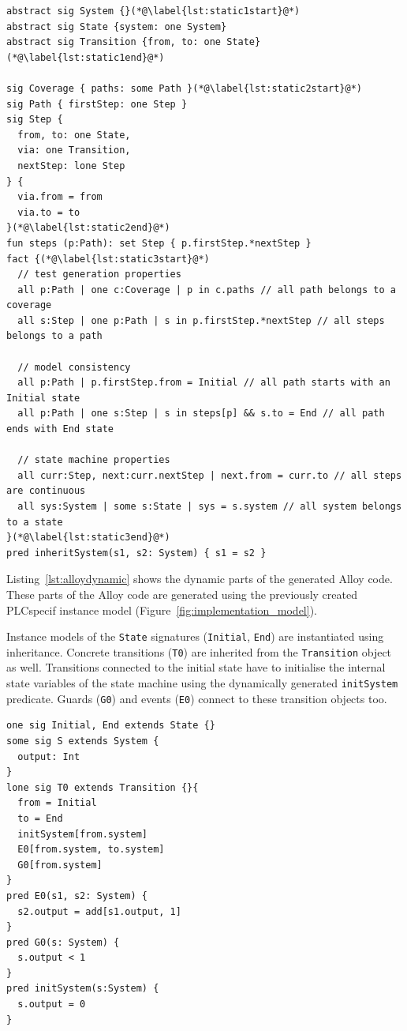 \begin{lstlisting}[label={lst:alloystatic}, caption=Static parts of the generated Alloy code,breaklines=true]
abstract sig System {}(*@\label{lst:static1start}@*)
abstract sig State {system: one System}
abstract sig Transition {from, to: one State}(*@\label{lst:static1end}@*)

sig Coverage { paths: some Path }(*@\label{lst:static2start}@*)
sig Path { firstStep: one Step }
sig Step {
  from, to: one State,
  via: one Transition,
  nextStep: lone Step
} {
  via.from = from
  via.to = to
}(*@\label{lst:static2end}@*)
fun steps (p:Path): set Step { p.firstStep.*nextStep }
fact {(*@\label{lst:static3start}@*)
  // test generation properties
  all p:Path | one c:Coverage | p in c.paths // all path belongs to a coverage
  all s:Step | one p:Path | s in p.firstStep.*nextStep // all steps belongs to a path

  // model consistency
  all p:Path | p.firstStep.from = Initial // all path starts with an Initial state
  all p:Path | one s:Step | s in steps[p] && s.to = End // all path ends with End state
	
  // state machine properties
  all curr:Step, next:curr.nextStep | next.from = curr.to // all steps are continuous
  all sys:System | some s:State | sys = s.system // all system belongs to a state
}(*@\label{lst:static3end}@*)
pred inheritSystem(s1, s2: System) { s1 = s2 }
\end{lstlisting}

Listing~\ref{lst:alloydynamic} shows the dynamic parts of the generated Alloy code. These parts of the Alloy code are generated using the previously created PLCspecif instance model (Figure~\ref{fig:implementation_model}).

Instance models of the \texttt{State} signatures (\texttt{Initial}, \texttt{End}) are instantiated using inheritance. Concrete transitions (\texttt{T0}) are inherited from the \texttt{Transition} object as well. Transitions connected to the initial state have to initialise the internal state variables of the state machine using the dynamically generated \texttt{initSystem} predicate. Guards (\texttt{G0}) and events (\texttt{E0}) connect to these transition objects too.

\begin{lstlisting}[label={lst:alloydynamic}, caption=Dynamic parts of the generated Alloy code,breaklines=true]
one sig Initial, End extends State {}
some sig S extends System {
  output: Int
}
lone sig T0 extends Transition {}{
  from = Initial
  to = End
  initSystem[from.system]
  E0[from.system, to.system]
  G0[from.system]
}
pred E0(s1, s2: System) {
  s2.output = add[s1.output, 1]	
}
pred G0(s: System) {
  s.output < 1
}
pred initSystem(s:System) {
  s.output = 0
}
\end{lstlisting}

